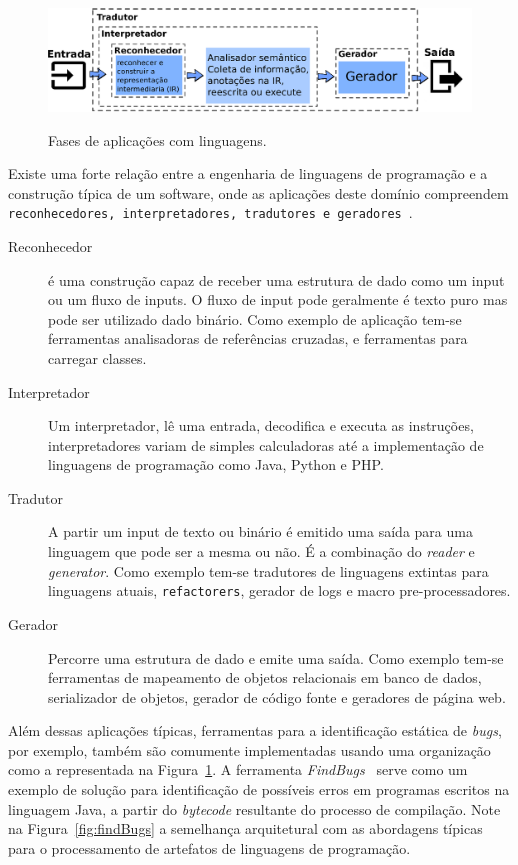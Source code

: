 \begin{figure}[h]
  \center
  \includegraphics[scale=0.9]{Imagens/stagesLanguageApp}
  \label{fig:stagesLanguageApp}
  \caption{Fases de aplicações com linguagens.}
\end{figure}

Existe uma forte relação entre a engenharia de linguagens de programação e a construção típica de um software, onde as aplicações deste domínio compreendem \texttt{reconhecedores, interpretadores, tradutores e geradores}~\cite{Parr:2009:LIP:1823613}. 

\begin{description}

\item[Reconhecedor] é uma construção capaz de receber uma estrutura de dado como um input ou um fluxo de inputs. O fluxo de input pode geralmente é texto puro mas pode ser utilizado dado binário. Como exemplo de aplicação tem-se ferramentas analisadoras de referências cruzadas, e ferramentas para carregar classes.

\item[Interpretador] Um interpretador, lê uma entrada, decodifica e executa as instruções, interpretadores variam de simples calculadoras até a implementação de linguagens de programação como Java, Python e PHP.

\item[Tradutor]A partir um input de texto ou binário é emitido uma saída para uma linguagem que pode ser a mesma ou não. É a combinação do \textit{reader} e \textit{generator}. Como exemplo tem-se tradutores de linguagens extintas para linguagens atuais, \texttt{refactorers},  gerador de logs e macro pre-processadores.
	
\item[Gerador] Percorre uma estrutura de dado e emite uma saída. Como exemplo tem-se ferramentas de mapeamento de objetos relacionais em banco de dados, serializador de objetos, gerador de código fonte e geradores de página web.

\end{description}


Além dessas aplicações típicas, ferramentas para a identificação estática de \emph{bugs}, por exemplo, também são comumente implementadas usando uma organização como a representada na Figura~\ref{fig:stagesLanguageApp}. A ferramenta \textit{FindBugs}~\cite{FindBugs} serve como um exemplo de solução para identificação  de possíveis erros em programas escritos na linguagem Java, a partir do \emph{bytecode} resultante do processo de compilação. Note na Figura~\ref{fig:findBugs} a semelhança arquitetural com as abordagens típicas para o processamento de artefatos de linguagens de programação. 

